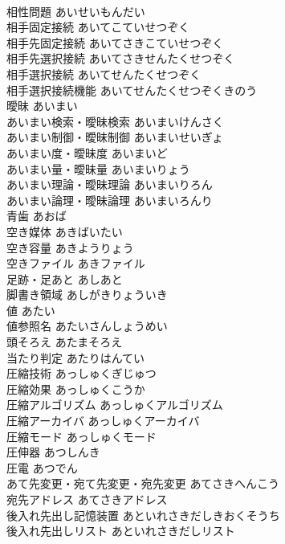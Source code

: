 \documentclass[8pt]{extreport}
\begin{document}
\begin{CJK}{UTF8}{min}
\\	相性問題	あいせいもんだい	
\\	相手固定接続	あいてこていせつぞく	
\\	相手先固定接続	あいてさきこていせつぞく	
\\	相手先選択接続	あいてさきせんたくせつぞく	
\\	相手選択接続	あいてせんたくせつぞく	
\\	相手選択接続機能	あいてせんたくせつぞくきのう	
\\	曖昧	あいまい	
\\	あいまい検索・曖昧検索	あいまいけんさく	
\\	あいまい制御・曖昧制御	あいまいせいぎょ	
\\	あいまい度・曖昧度	あいまいど	
\\	あいまい量・曖昧量	あいまいりょう	
\\	あいまい理論・曖昧理論	あいまいりろん	
\\	あいまい論理・曖昧論理	あいまいろんり	
\\	青歯	あおば	
\\	空き媒体	あきばいたい	
\\	空き容量	あきようりょう	
\\	空きファイル	あきファイル	
\\	足跡・足あと	あしあと	
\\	脚書き領域	あしがきりょういき	
\\	値	あたい	
\\	値参照名	あたいさんしょうめい	
\\	頭そろえ	あたまそろえ	
\\	当たり判定	あたりはんてい	
\\	圧縮技術	あっしゅくぎじゅつ	
\\	圧縮効果	あっしゅくこうか	
\\	圧縮アルゴリズム	あっしゅくアルゴリズム	
\\	圧縮アーカイバ	あっしゅくアーカイバ	
\\	圧縮モード	あっしゅくモード	
\\	圧伸器	あつしんき	
\\	圧電	あつでん	
\\	あて先変更・宛て先変更・宛先変更	あてさきへんこう	
\\	宛先アドレス	あてさきアドレス	
\\	後入れ先出し記憶装置	あといれさきだしきおくそうち	
\\	後入れ先出しリスト	あといれさきだしリスト	

\end{CJK}
\end{document}
